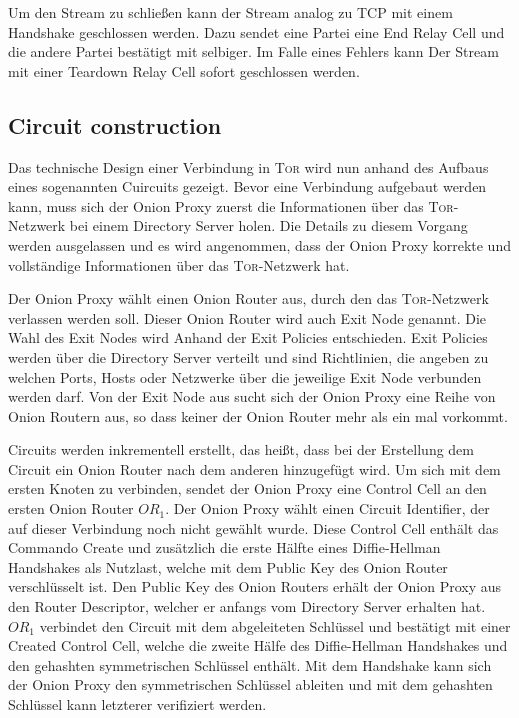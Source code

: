 \documentclass[fleqn,envcountsame,runningheads,10pt,a4paper]{llncs}
\begin{document}
Um den Stream zu schließen kann der Stream analog zu TCP mit einem Handshake geschlossen werden. Dazu sendet eine Partei eine End Relay Cell und die andere Partei bestätigt mit selbiger. Im Falle eines Fehlers kann Der Stream mit einer Teardown Relay Cell sofort geschlossen werden.

\subsection{Circuit construction}
\label{sec:ciruit_construction} 

Das technische Design einer Verbindung in \textsc{Tor} wird nun anhand des Aufbaus eines sogenannten Cuircuits gezeigt. Bevor eine Verbindung aufgebaut werden kann, muss sich der Onion Proxy zuerst die Informationen über das \textsc{Tor}-Netzwerk bei einem Directory Server holen. Die Details zu diesem Vorgang werden ausgelassen und es wird angenommen, dass der Onion Proxy korrekte und vollständige Informationen über das \textsc{Tor}-Netzwerk hat.

Der Onion Proxy wählt einen Onion Router aus, durch den das \textsc{Tor}-Netzwerk verlassen werden soll. Dieser Onion Router wird auch Exit Node genannt. Die Wahl des Exit Nodes wird Anhand der Exit Policies entschieden. Exit Policies werden über die Directory Server verteilt und sind Richtlinien, die angeben zu welchen Ports, Hosts oder Netzwerke über die jeweilige Exit Node verbunden werden darf. Von der Exit Node aus sucht sich der Onion Proxy eine Reihe von Onion Routern aus, so dass keiner der Onion Router mehr als ein mal vorkommt.

Circuits werden inkrementell erstellt, das heißt, dass bei der Erstellung dem Circuit ein Onion Router nach dem anderen hinzugefügt wird. Um sich mit dem ersten Knoten zu verbinden, sendet der Onion Proxy eine Control Cell an den ersten Onion Router $\textit{OR}_1$. Der Onion Proxy wählt einen Circuit Identifier, der auf dieser Verbindung noch nicht gewählt wurde. Diese Control Cell enthält das Commando Create und zusätzlich die erste Hälfte eines Diffie-Hellman Handshakes als Nutzlast, welche mit dem Public Key des Onion Router verschlüsselt ist. Den Public Key des Onion Routers erhält der Onion Proxy aus den Router Descriptor, welcher er anfangs vom Directory Server erhalten hat. $\textit{OR}_1$ verbindet den Circuit mit dem abgeleiteten Schlüssel und  bestätigt mit einer Created Control Cell, welche die zweite Hälfe des Diffie-Hellman Handshakes und den gehashten symmetrischen Schlüssel enthält. Mit dem Handshake kann sich der Onion Proxy den symmetrischen Schlüssel ableiten und mit dem gehashten Schlüssel kann letzterer verifiziert werden.
\end{document}
